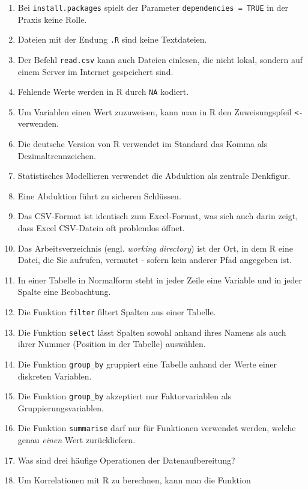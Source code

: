 \documentclass[12pt,ngerman,]{book}
\begin{document}
\begin{enumerate}
\def\labelenumi{\arabic{enumi}.}
\item
  Bei \texttt{install.packages} spielt der Parameter
  \texttt{dependencies\ =\ TRUE} in der Praxis keine Rolle.
\item
  Dateien mit der Endung \texttt{.R} sind keine Textdateien.
\item
  Der Befehl \texttt{read.csv} kann auch Dateien einlesen, die nicht
  lokal, sondern auf einem Server im Internet gespeichert sind.
\item
  Fehlende Werte werden in R durch \texttt{NA} kodiert.
\item
  Um Variablen einen Wert zuzuweisen, kann man in R den Zuweisungspfeil
  \texttt{\textless{}-} verwenden.
\item
  Die deutsche Version von R verwendet im Standard das Komma als
  Dezimaltrennzeichen.
\item
  Statistisches Modellieren verwendet die Abduktion als zentrale
  Denkfigur.
\item
  Eine Abduktion führt zu sicheren Schlüssen.
\item
  Das CSV-Format ist identisch zum Excel-Format, was sich auch darin
  zeigt, dass Excel CSV-Datein oft problemlos öffnet.
\item
  Das Arbeitsverzeichnis (engl. \emph{working directory}) ist der Ort,
  in dem R eine Datei, die Sie aufrufen, vermutet - sofern kein anderer
  Pfad angegeben ist.
\item
  In einer Tabelle in Normalform steht in jeder Zeile eine Variable und
  in jeder Spalte eine Beobachtung.
\item
  Die Funktion \texttt{filter} filtert Spalten aus einer Tabelle.
\item
  Die Funktion \texttt{select} lässt Spalten sowohl anhand ihres Namens
  als auch ihrer Nummer (Position in der Tabelle) auswählen.
\item
  Die Funktion \texttt{group\_by} gruppiert eine Tabelle anhand der
  Werte einer diskreten Variablen.
\item
  Die Funktion \texttt{group\_by} akzeptiert nur Faktorvariablen als
  Gruppierungsvariablen.
\item
  Die Funktion \texttt{summarise} darf nur für Funktionen verwendet
  werden, welche genau \emph{einen} Wert zurückliefern.
\item
  Was sind drei häufige Operationen der Datenaufbereitung?
\item
  Um Korrelationen mit R zu berechnen, kann man die Funktion

\end{enumerate}
\end{document}
